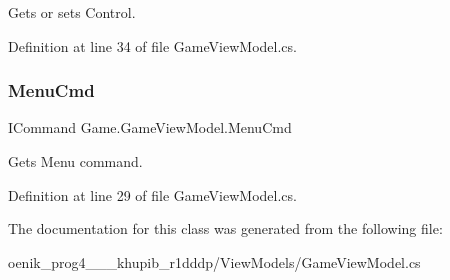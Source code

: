 Gets or sets Control. 



Definition at line 34 of file Game\+View\+Model.\+cs.

\mbox{\label{class_game_1_1_game_view_model_a56870b83795273e43f980ffaf4fef79a}} 
\subsubsection{\texorpdfstring{MenuCmd}{MenuCmd}}
{\footnotesize\ttfamily I\+Command Game.\+Game\+View\+Model.\+Menu\+Cmd\hspace{0.3cm}{\ttfamily [get]}}



Gets Menu command. 



Definition at line 29 of file Game\+View\+Model.\+cs.



The documentation for this class was generated from the following file\+:\begin{DoxyCompactItemize}
\item 
oenik\+\_\+prog4\+\_\+\_\+\_\+khupib\+\_\+r1dddp/\+View\+Models/Game\+View\+Model.\+cs\end{DoxyCompactItemize}

